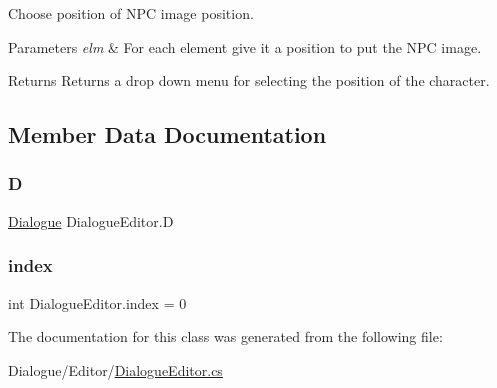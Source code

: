 Choose position of N\+PC image position. 


\begin{DoxyParams}{Parameters}
{\em elm} & For each element give it a position to put the N\+PC image.\\
\hline
\end{DoxyParams}
\begin{DoxyReturn}{Returns}
Returns a drop down menu for selecting the position of the character.
\end{DoxyReturn}


\subsection{Member Data Documentation}
\mbox{\label{class_dialogue_editor_aa05e8f2205c153236f9d2ce81b4857c3}} 
\subsubsection{\texorpdfstring{D}{D}}
{\footnotesize\ttfamily \mbox{\hyperlink{class_dialogue}{Dialogue}} Dialogue\+Editor.\+D\hspace{0.3cm}{\ttfamily [private]}}

\mbox{\label{class_dialogue_editor_a283d0bf74d897ae870ad3bdc7c7dcd2a}} 
\subsubsection{\texorpdfstring{index}{index}}
{\footnotesize\ttfamily int Dialogue\+Editor.\+index = 0\hspace{0.3cm}{\ttfamily [private]}}



The documentation for this class was generated from the following file\+:\begin{DoxyCompactItemize}
\item 
Dialogue/\+Editor/\mbox{\hyperlink{_dialogue_editor_8cs}{Dialogue\+Editor.\+cs}}\end{DoxyCompactItemize}
